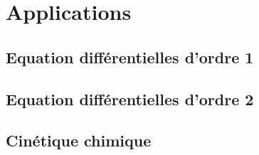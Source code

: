 \section{Applications}
\subsection{Equation différentielles d'ordre 1}
\setcounter{thequestion}{0}

\subsection{Equation différentielles d'ordre 2}
\setcounter{thequestion}{0}

\subsection{Cinétique chimique}
\setcounter{thequestion}{0}

